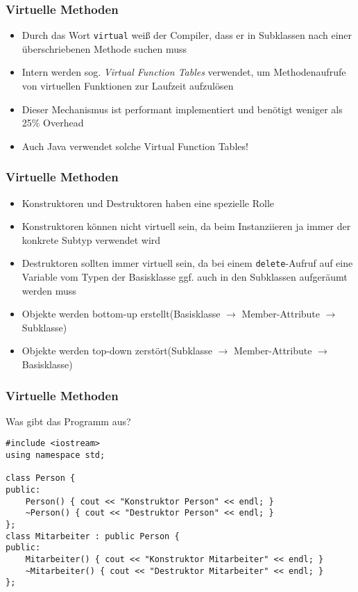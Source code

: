 \documentclass[]{beamer}
\newcommand{\bi}{\begin{itemize}}
\newcommand{\ei}{\end{itemize}}
\begin{document}
\begin{frame}[fragile]
	\frametitle{Virtuelle Methoden}
	\bi
	\item Durch das Wort \lstinline|virtual| weiß der Compiler, dass er in Subklassen nach einer überschriebenen Methode suchen muss
	\item Intern werden sog. \emph{Virtual Function Tables} verwendet, um Methodenaufrufe von virtuellen Funktionen zur Laufzeit aufzulösen
	\item Dieser Mechanismus ist performant implementiert und benötigt weniger als 25\% Overhead
	\item Auch Java verwendet solche Virtual Function Tables!
	\ei
\end{frame}

\begin{frame}[fragile]
	\frametitle{Virtuelle Methoden}
	\bi
	\item Konstruktoren und Destruktoren haben eine spezielle Rolle
	\item Konstruktoren können nicht virtuell sein, da beim Instanziieren ja immer der konkrete Subtyp verwendet wird
	\item Destruktoren sollten immer virtuell sein, da bei einem \lstinline|delete|-Aufruf auf eine Variable vom Typen der Basisklasse ggf. auch in den Subklassen aufgeräumt werden muss
	\item Objekte werden bottom-up erstellt\newline(Basisklasse $\rightarrow$ Member-Attribute $\rightarrow$ Subklasse)
	\item Objekte werden top-down zerstört\newline(Subklasse $\rightarrow$ Member-Attribute $\rightarrow$ Basisklasse)
	\ei
\end{frame}

\begin{frame}[fragile]
	\frametitle{Virtuelle Methoden}
	Was gibt das Programm aus?
\footnotesize
	\begin{lstlisting}
#include <iostream>
using namespace std;

class Person {
public:
	Person() { cout << "Konstruktor Person" << endl; }
	~Person() { cout << "Destruktor Person" << endl; }
};
class Mitarbeiter : public Person {
public:
	Mitarbeiter() { cout << "Konstruktor Mitarbeiter" << endl; }
	~Mitarbeiter() { cout << "Destruktor Mitarbeiter" << endl; }
};
	\end{lstlisting}
\end{frame}
\end{document}
